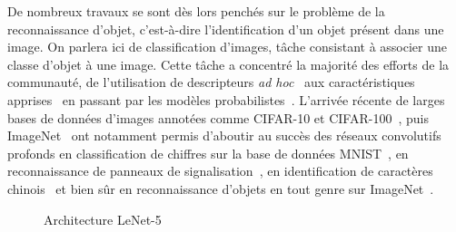 De nombreux travaux se sont dès lors penchés sur le problème de la reconnaissance d'objet, c'est-à-dire l'identification d'un objet présent dans une image. On parlera ici de classification d'images, tâche consistant à associer une classe d'objet à une image. Cette tâche a concentré la majorité des efforts de la communauté, de l'utilisation de descripteurs \emph{ad hoc}~\cite{ullman_aligning_1989} aux caractéristiques apprises~\cite{vidal-naquet_object_2003} en passant par les modèles probabilistes~\cite{schneiderman_probabilistic_1998}. L'arrivée récente de larges bases de données d'images annotées comme CIFAR-10 et CIFAR-100~\cite{krizhevsky_learning_2009}, puis ImageNet~\cite{deng_imagenet_2009,russakovsky_imagenet_2015} ont notamment permis d'aboutir au succès des réseaux convolutifs profonds en classification de chiffres sur la base de données MNIST~\cite{lecun_gradient-based_1998}, en reconnaissance de panneaux de signalisation~\cite{stallkamp_german_2011}, en identification de caractères chinois~\cite{liu_icdar_2011} et bien sûr en reconnaissance d'objets en tout genre sur ImageNet~\cite{krizhevsky_imagenet_2012}.

\begin{figure}[t]
  \resizebox{\textwidth}{!}{
    
  }
  \caption{Architecture LeNet-5~\cite{lecun_gradient-based_1998}}
  \label{fig:lenet}
\end{figure}

